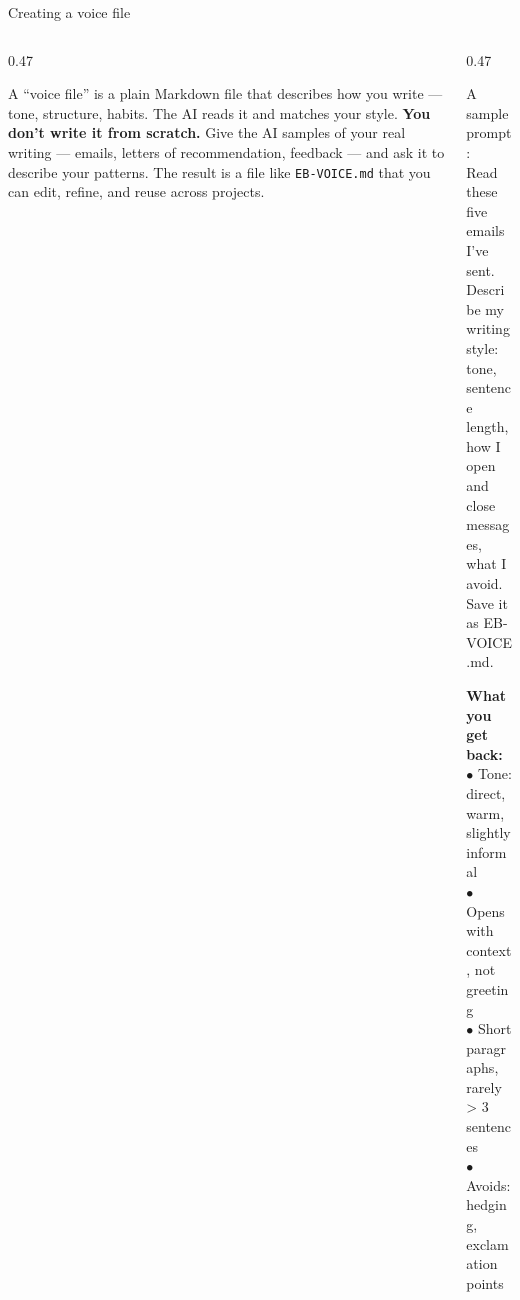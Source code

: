 \documentclass[aspectratio=169, 10pt]{beamer}
\begin{document}
\begin{frame}[fragile]{Creating a voice file}
\begin{columns}[T]
\begin{column}{0.47\textwidth}
\begin{tcolorbox}[accentbox]
\small
A ``voice file'' is a plain Markdown file that describes how you write --- tone, structure, habits. The AI reads it and matches your style.
\vskip4pt
\textbf{You don't write it from scratch.} Give the AI samples of your real writing --- emails, letters of recommendation, feedback --- and ask it to describe your patterns.
\vskip4pt
The result is a file like \texttt{EB-VOICE.md} that you can edit, refine, and reuse across projects.
\end{tcolorbox}
\end{column}
\begin{column}{0.47\textwidth}
\begin{tcolorbox}[colback=DarkSlate, colframe=DarkSlate, arc=3pt, left=6pt, right=6pt, top=4pt, bottom=4pt]
{\color{CoolGray}\ttfamily\tiny A sample prompt:\\[2pt]
\color{white}\scriptsize
Read these five emails I've sent.\\
Describe my writing style: tone,\\
sentence length, how I open and\\
close messages, what I avoid.\\
Save it as EB-VOICE.md.
}
\end{tcolorbox}
\vskip3pt
\begin{tcolorbox}[quotebox, top=3pt, bottom=3pt]
\small
\textbf{What you get back:}\\[2pt]
{\scriptsize $\bullet$ Tone: direct, warm, slightly informal\\
$\bullet$ Opens with context, not greeting\\
$\bullet$ Short paragraphs, rarely > 3 sentences\\
$\bullet$ Avoids: hedging, exclamation points}
\end{tcolorbox}
\end{column}
\end{columns}
\end{frame}
\end{document}

